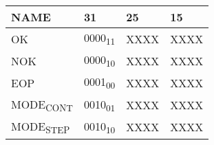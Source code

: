 \documentclass[11pt]{article}
\begin{document}
\begin{center}
\begin{tabular}{llll}
NAME & 31 & 25 & 15\\
\hline
OK & 0000\textsubscript{11} & XXXX & XXXX\\
NOK & 0000\textsubscript{10} & XXXX & XXXX\\
EOP & 0001\textsubscript{00} & XXXX & XXXX\\
MODE\textsubscript{CONT} & 0010\textsubscript{01} & XXXX & XXXX\\
MODE\textsubscript{STEP} & 0010\textsubscript{10} & XXXX & XXXX\\
\end{tabular}
\end{center}
\end{document}
